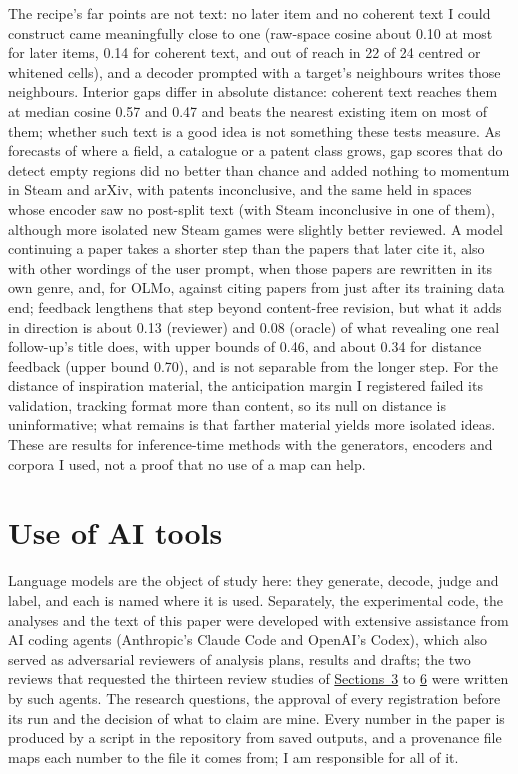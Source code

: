 \documentclass[
  10pt,
]{article}
\begin{document}
The recipe's far points are not text: no
later item and no coherent text I could
construct came meaningfully close to one
(raw-space cosine about 0.10 at most for
later items, 0.14 for coherent text, and
out of reach in 22 of 24 centred or
whitened cells), and a decoder prompted
with a target's neighbours writes those
neighbours. Interior gaps differ in
absolute distance: coherent text reaches
them at median cosine 0.57 and 0.47 and
beats the nearest existing item on most
of them; whether such text is a good
idea is not something these tests
measure. As forecasts of where a field,
a catalogue or a patent class grows, gap
scores that do detect empty regions did
no better than chance and added nothing
to momentum in Steam and arXiv, with
patents inconclusive, and the same held
in spaces whose encoder saw no
post-split text (with Steam inconclusive
in one of them), although more isolated
new Steam games were slightly better
reviewed. A model continuing a paper
takes a shorter step than the papers
that later cite it, also with other
wordings of the user prompt, when those
papers are rewritten in its own genre,
and, for OLMo, against citing papers
from just after its training data end;
feedback lengthens that step beyond
content-free revision, but what it adds
in direction is about 0.13 (reviewer)
and 0.08 (oracle) of what revealing one
real follow-up's title does, with upper
bounds of 0.46, and about 0.34 for
distance feedback (upper bound 0.70),
and is not separable from the longer
step. For the distance of inspiration
material, the anticipation margin I
registered failed its validation,
tracking format more than content, so
its null on distance is uninformative;
what remains is that farther material
yields more isolated ideas. These are
results for inference-time methods with
the generators, encoders and corpora I
used, not a proof that no use of a map
can help.

\section*{Use of AI tools}

Language models are the object of study
here: they generate, decode, judge and
label, and each is named where it is
used. Separately, the experimental code,
the analyses and the text of this paper
were developed with extensive assistance
from AI coding agents (Anthropic's
Claude Code and OpenAI's Codex), which
also served as adversarial reviewers of
analysis plans, results and drafts; the
two reviews that requested the thirteen
review studies of
\hyperref[sec:3]{Sections~3} to
\hyperref[sec:6]{6} were written by such
agents. The research questions, the
approval of every registration before
its run and the decision of what to
claim are mine. Every number in the
paper is produced by a script in the
repository from saved outputs, and a
provenance file maps each number to the
file it comes from; I am responsible for
all of it.
\end{document}
